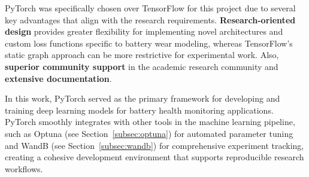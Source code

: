 PyTorch was specifically chosen over TensorFlow for this project due to several key advantages that align with the research requirements. \textbf{Research-oriented design} provides greater flexibility for implementing novel architectures and custom loss functions specific to battery wear modeling, whereas TensorFlow's static graph approach can be more restrictive for experimental work. Also, \textbf{superior community support} in the academic research community and \textbf{extensive documentation}.

In this work, PyTorch served as the primary framework for developing and training deep learning models for battery health monitoring applications. PyTorch smoothly integrates with other tools in the machine learning pipeline, such as Optuna (see Section~\ref{subsec:optuna}) for automated parameter tuning and WandB (see Section~\ref{subsec:wandb}) for comprehensive experiment tracking, creating a cohesive development environment that supports reproducible research workflows.



